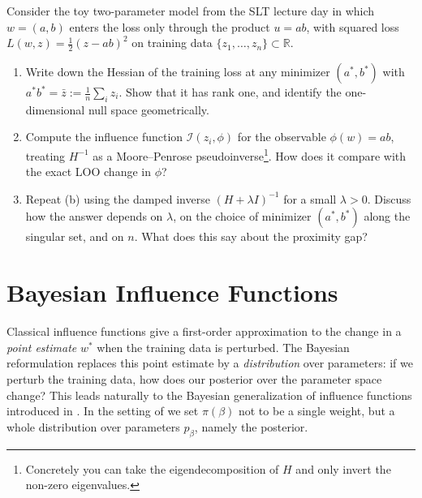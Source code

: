 \documentclass[11pt]{article}
\begin{document}
\begin{exercise}\label{ex:if-degenerate}
Consider the toy two-parameter model from the SLT lecture day in which $w = (a,b)$ enters the loss only through the product $u = ab$, with squared loss $L(w,z) = \tfrac12(z - ab)^2$ on training data $\{z_1,\dots,z_n\}\subset\mathbb{R}$.
\begin{enumerate}
  \item[(a)] Write down the Hessian of the training loss at any minimizer $(a^*,b^*)$ with $a^* b^* = \bar z := \tfrac1n\sum_i z_i$. Show that it has rank one, and identify the one-dimensional null space geometrically.
  \item[(b)] Compute the influence function $\mathcal{I}(z_i,\phi)$ for the observable $\phi(w) = ab$, treating $H^{-1}$ as a Moore--Penrose pseudoinverse\footnote{Concretely you can take the eigendecomposition of $H$ and only invert the non-zero eigenvalues.}. How does it compare with the exact LOO change in $\phi$?
  \item[(c)] Repeat (b) using the damped inverse $(H + \lambda I)^{-1}$ for a small $\lambda > 0$. Discuss how the answer depends on $\lambda$, on the choice of minimizer $(a^*,b^*)$ along the singular set, and on $n$. What does this say about the proximity gap?
\end{enumerate}
\end{exercise}


\section{Bayesian Influence Functions}\label{sec:bayesian-if}

Classical influence functions give a first-order approximation to the change in a \emph{point estimate} $w^*$ when the training data is perturbed. The Bayesian reformulation replaces this point estimate by a \emph{distribution} over parameters: if we perturb the training data, how does our posterior over the parameter space change? This leads naturally to the Bayesian generalization of influence functions introduced in \citet{kreer2025bif}. In the setting of  we set $\pi(\beta)$ not to be a single weight, but a whole distribution over parameters $p_{\beta}$, namely the posterior.
\end{document}
